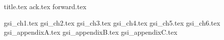 \documentclass[12pt,letterpaper,oneside]{scrbook}
\begin{document}
\frontmatter
{title.tex}
\clearpage
\thispagestyle{empty}
{ack.tex}
{forward.tex}

\tableofcontents


\mainmatter
{gsi_ch1.tex}
{gsi_ch2.tex}
{gsi_ch3.tex}
{gsi_ch4.tex}
{gsi_ch5.tex}
{gsi_ch6.tex}
\appendix
{gsi_appendixA.tex}
{gsi_appendixB.tex}
{gsi_appendixC.tex}


\backmatter



\end{document}
